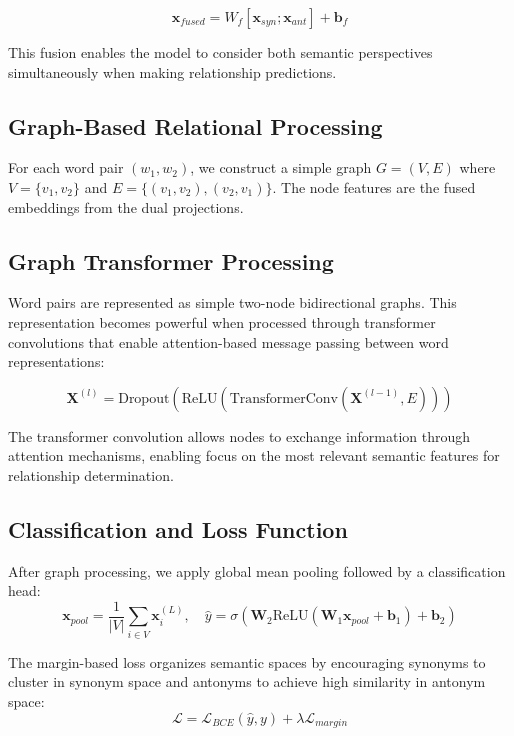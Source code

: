 \documentclass[11pt]{article}
\begin{document}
\begin{equation}
\mathbf{x}_{fused} = W_f[\mathbf{x}_{syn}; \mathbf{x}_{ant}] + \mathbf{b}_f
\end{equation}

This fusion enables the model to consider both semantic perspectives simultaneously when making relationship predictions.

\subsection{Graph-Based Relational Processing}

For each word pair $(w_1, w_2)$, we construct a simple graph $G = (V, E)$ where $V = \{v_1, v_2\}$ and $E = \{(v_1, v_2), (v_2, v_1)\}$. The node features are the fused embeddings from the dual projections.

\subsection{Graph Transformer Processing}
Word pairs are represented as simple two-node bidirectional graphs. This representation becomes powerful when processed through transformer convolutions that enable attention-based message passing between word representations:

\begin{equation}
\mathbf{X}^{(l)} = \text{Dropout}(\text{ReLU}(\text{TransformerConv}(\mathbf{X}^{(l-1)}, E)))
\end{equation}

The transformer convolution allows nodes to exchange information through attention mechanisms, enabling focus on the most relevant semantic features for relationship determination.

\subsection{Classification and Loss Function}
After graph processing, we apply global mean pooling followed by a classification head:
\begin{equation}
\mathbf{x}_{pool} = \frac{1}{|V|}\sum_{i \in V} \mathbf{x}_i^{(L)}, \quad \hat{y} = \sigma(\mathbf{W}_2\text{ReLU}(\mathbf{W}_1\mathbf{x}_{pool} + \mathbf{b}_1) + \mathbf{b}_2)
\end{equation}

The margin-based loss organizes semantic spaces by encouraging synonyms to cluster in synonym space and antonyms to achieve high similarity in antonym space:
\begin{equation}
\mathcal{L} = \mathcal{L}_{BCE}(\hat{y}, y) + \lambda \mathcal{L}_{margin}
\end{equation}
\end{document}
